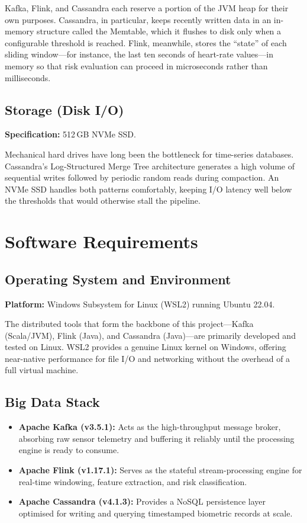 \documentclass[12pt, a4paper, oneside]{report}
\begin{document}
Kafka, Flink, and Cassandra each reserve a portion of the JVM heap for their own purposes. Cassandra, in particular, keeps recently written data in an in-memory structure called the Memtable, which it flushes to disk only when a configurable threshold is reached. Flink, meanwhile, stores the ``state'' of each sliding window---for instance, the last ten seconds of heart-rate values---in memory so that risk evaluation can proceed in microseconds rather than milliseconds.

\subsection{Storage (Disk I/O)}
\textbf{Specification:} 512\,GB NVMe SSD.

Mechanical hard drives have long been the bottleneck for time-series databases. Cassandra's Log-Structured Merge Tree architecture generates a high volume of sequential writes followed by periodic random reads during compaction. An NVMe SSD handles both patterns comfortably, keeping I/O latency well below the thresholds that would otherwise stall the pipeline.

\section{Software Requirements}

\subsection{Operating System and Environment}
\textbf{Platform:} Windows Subsystem for Linux (WSL2) running Ubuntu 22.04.

The distributed tools that form the backbone of this project---Kafka (Scala/JVM), Flink (Java), and Cassandra (Java)---are primarily developed and tested on Linux. WSL2 provides a genuine Linux kernel on Windows, offering near-native performance for file I/O and networking without the overhead of a full virtual machine.

\subsection{Big Data Stack}
\begin{itemize}
    \item \textbf{Apache Kafka (v3.5.1):} Acts as the high-throughput message broker, absorbing raw sensor telemetry and buffering it reliably until the processing engine is ready to consume.
    \item \textbf{Apache Flink (v1.17.1):} Serves as the stateful stream-processing engine for real-time windowing, feature extraction, and risk classification.
    \item \textbf{Apache Cassandra (v4.1.3):} Provides a NoSQL persistence layer optimised for writing and querying timestamped biometric records at scale.
\end{itemize}
\end{document}
